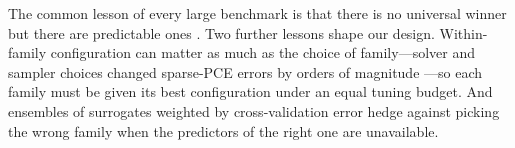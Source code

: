 The common lesson of every large benchmark is that there is no universal winner but there are predictable ones
\cite{jin2001comparative,williams2021novel,fuhg2021state,moustapha2022active,luthen2021sparse,neufang2024surrogate}.
Two further lessons shape our design. Within-family configuration can matter as much as the choice of family---solver
and sampler choices changed sparse-PCE errors by orders of magnitude \cite{luthen2021sparse}---so each family must be
given its best configuration under an equal tuning budget. And ensembles of surrogates weighted by cross-validation
error \cite{goel2007ensemble,viana2009multiple,wolpert1992stacked} hedge against picking the wrong family when the
predictors of the right one are unavailable.
